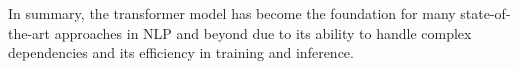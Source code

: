 In summary, the transformer model has become the foundation for many state-of-the-art approaches in NLP and beyond due to its ability to handle complex dependencies and its efficiency in training and inference.






